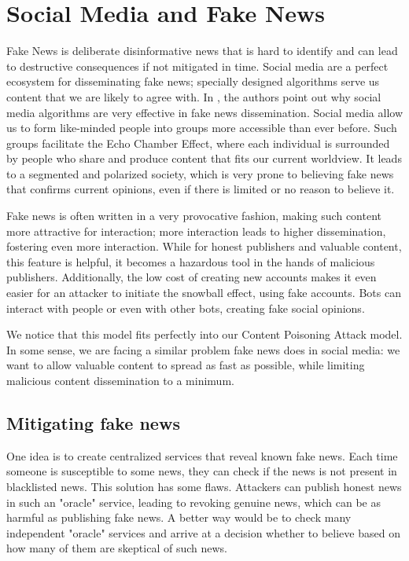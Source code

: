 \section{Social Media and Fake News}
Fake News is deliberate disinformative news that is hard to identify and can lead to destructive consequences if not mitigated in time. Social media are a perfect ecosystem for disseminating fake news; specially designed algorithms serve us content that we are likely to agree with. In \cite{zhou2018fake}, the authors point out why social media algorithms are very effective in fake news dissemination. Social media allow us to form like-minded people into groups more accessible than ever before. Such groups facilitate the Echo Chamber Effect, where each individual is surrounded by people who share and produce content that fits our current worldview. It leads to a segmented and polarized society, which is very prone to believing fake news that confirms current opinions, even if there is limited or no reason to believe it. 

Fake news is often written in a very provocative fashion, making such content more attractive for interaction; more interaction leads to higher dissemination, fostering even more interaction. While for honest publishers and valuable content, this feature is helpful, it becomes a hazardous tool in the hands of malicious publishers. Additionally, the low cost of creating new accounts makes it even easier for an attacker to initiate the snowball effect, using fake accounts. Bots can interact with people or even with other bots, creating fake social opinions.  

We notice that this model fits perfectly into our Content Poisoning Attack model. In some sense, we are facing a similar problem fake news does in social media: we want to allow valuable content to spread as fast as possible, while limiting malicious content dissemination to a minimum.


\subsection{Mitigating fake news}
\label{mitigating-certification-services}
One idea is to create centralized services that reveal known fake news. Each time someone is susceptible to some news, they can check if the news is not present in blacklisted news. This solution has some flaws. Attackers can publish honest news in such an "oracle" service, leading to revoking genuine news, which can be as harmful as publishing fake news. A better way would be to check many independent "oracle" services and arrive at a decision whether to believe based on how many of them are skeptical of such news.

